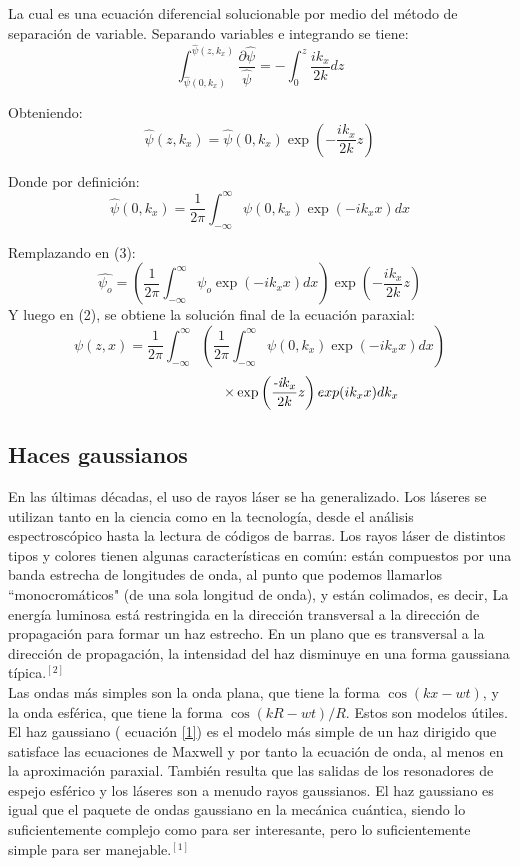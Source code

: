 \documentclass[11pt,letterpaper,twocolumn]{article}
\begin{document}
La cual es una ecuación diferencial solucionable por medio del método de separación de variable. Separando variables e integrando se tiene: 
$$\int_{\hat{\psi}(0,k_{x})}^{\hat{\psi}(z,k_{x})} \dfrac{\partial \hat{\psi}}{\hat{\psi}} = - \int_{0}^{z} \dfrac{\textit{i}k_{x}}{2k} dz $$
\par 
Obteniendo: 
\begin{equation}
\hat{\psi}(z,k_{x})=\hat{\psi}(0,k_{x}) \exp\left(- \dfrac{\textit{i}k_{x}}{2k}z\right)
\end{equation}
\par 
Donde por definición: 
$$\hat{\psi}(0,k_{x})= \dfrac{1}{2\pi}\int_{-\infty}^{\infty} \psi(0,k_{x}) \exp\left(-\textit{i}k_{x} x \right) dx$$
\par 
Remplazando en (3):
$$\hat{\psi_{o}}= \left(\dfrac{1}{2\pi} \int_{-\infty}^{\infty} \psi_{o} \exp\left(-\textit{i}k_{x} x \right) dx \right) \exp\left(- \dfrac{\textit{i}k_{x}}{2k}z\right) $$
Y luego en (2), se obtiene la solución final de la ecuación paraxial: 
$$\psi(z,x)= \dfrac{1}{2\pi} \int_{-\infty}^{\infty}  \left(\dfrac{1}{2\pi} \int_{-\infty}^{\infty} \psi(0,k_{x}) \exp\left(-\textit{i}k_{x} x \right) dx \right) $$
\begin{equation}
\hspace*{2.6cm} \times \exp\left(\dfrac{\textit{-i}k_{x}}{2k}z\right) exp(ik_{x}x) dk_{x}
\end{equation}
\subsection*{Haces gaussianos}
En las últimas décadas, el uso de rayos láser se ha generalizado. Los láseres se utilizan tanto en la ciencia como en la tecnología, desde el análisis espectroscópico hasta la lectura de códigos de barras. Los rayos láser de distintos tipos y colores tienen algunas características en común: están compuestos por una banda estrecha de longitudes de onda, al punto que podemos llamarlos ``monocromáticos" (de una sola longitud de onda), y están colimados, es decir, La energía luminosa está restringida en la dirección transversal a la dirección de propagación para formar un haz estrecho. En un plano que es transversal a la dirección de propagación, la intensidad del haz disminuye en una forma gaussiana típica.$^{[2]}$\\

Las ondas más simples son la onda plana, que tiene la forma $\cos(kx-wt)$, y la onda esférica, que tiene la forma $\cos(kR-wt)/R$. Estos son modelos útiles. El haz gaussiano ( ecuación \ref{1}) es el modelo más simple de un haz dirigido que satisface las ecuaciones de Maxwell y por tanto la ecuación de onda, al menos en la aproximación paraxial. También resulta que las salidas de los resonadores de espejo esférico y los láseres son a menudo rayos gaussianos. El haz gaussiano es igual que el paquete de ondas gaussiano en la mecánica cuántica, siendo lo suficientemente complejo como para ser interesante, pero lo suficientemente simple para ser manejable.$^{[1]}$\\
\end{document}

